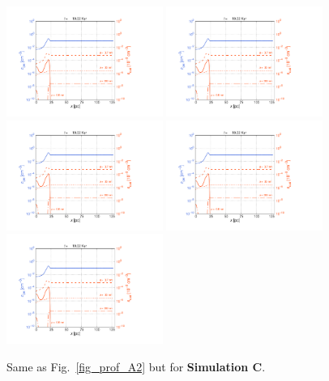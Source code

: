 \documentclass[fleqn,usenatbib]{mnras}
\begin{document}
  \begin{figure}
  \includegraphics[trim=2.4cm 1.5cm 9.0cm 2.0cm, clip=true,page=1,height = 3.6cm]{Pics/Pics_C2/Profile_dust.pdf}\hspace*{-0.05cm} 
  \includegraphics[trim=5.5cm 1.5cm 9.0cm 2.0cm, clip=true,page=2,height = 3.6cm]{Pics/Pics_C2/Profile_dust.pdf}\hspace*{-0.05cm} 
  \includegraphics[trim=5.5cm 1.5cm 9.0cm 2.0cm, clip=true,page=4,height = 3.6cm]{Pics/Pics_C2/Profile_dust.pdf}\hspace*{-0.05cm} 
  \includegraphics[trim=5.5cm 1.5cm 9.0cm 2.0cm, clip=true,page=5,height = 3.6cm]{Pics/Pics_C2/Profile_dust.pdf}\hspace*{-0.05cm} 
  \includegraphics[trim=5.5cm 1.5cm 6.0cm 2.0cm, clip=true,page=6,height = 3.6cm]{Pics/Pics_C2/Profile_dust.pdf}
  \caption{Same as Fig.~\ref{fig_prof_A2} but for \textbf{Simulation C}.}
   \label{fig_prof_C2} 
  \end{figure} 
  
\end{document}
